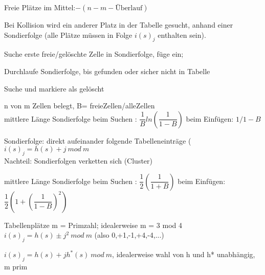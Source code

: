 Freie Plätze im Mittel:$ -(n - m - \text{Überlauf})   $


Bei Kollision wird ein anderer Platz in der Tabelle gesucht, anhand einer Sondierfolge (alle Plätze müssen in Folge $i(s)_j$ enthalten sein).

Suche erste freie/gelöschte Zelle in Sondierfolge, füge ein;

Durchlaufe Sondierfolge, bis gefunden oder sicher nicht in Tabelle 

 Suche und markiere als gelöscht

n von m Zellen belegt, B= freieZellen/alleZellen \\
mittlere Länge Sondierfolge beim Suchen : $\dfrac{1}{B}ln\left(\dfrac{1}{1-B}\right)$
beim Einfügen: $1/1-B$

Sondierfolge: direkt aufeinander folgende Tabelleneinträge ($i(s)_j=h(s)+j~mod~m$\\
Nachteil: Sondierfolgen verketten sich (Cluster)

mittlere Länge Sondierfolge beim Suchen : $\dfrac{1}{2}\left(\dfrac{1}{1+B}\right)$
beim Einfügen:  $\dfrac{1}{2}\left(1+\left(\dfrac{1}{1-B}\right)^2\right)$

Tabellenplätze m = Primzahl; idealerweise m = 3 mod 4 \\
$i(s)_j = h(s) \pm j^2~mod~m$ (also 0,+1,-1,+4,-4,...) 

$i(s)_j = h(s) + jh^*(s)~ mod~ m$, idealerweise wahl von h und h* unabhängig, m prim
